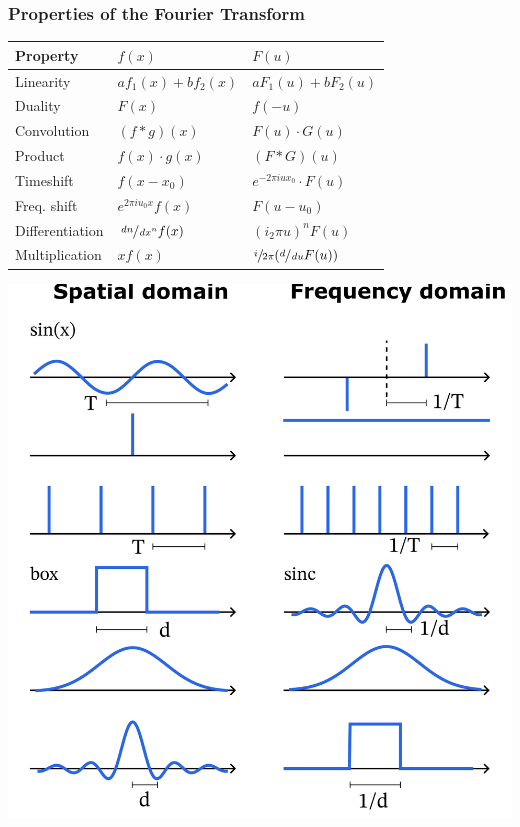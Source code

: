 \documentclass[a4paper,10pt]{article}
\renewcommand*{\arraystretch}{2}
\begin{document}
\subsubsection{Properties of the Fourier Transform}
\begin{center}
    {\renewcommand{\arraystretch}{1.2}
    \begin{tabularx}{\linewidth}{Xll}
	\toprule
	Property & \( f(x) \) & \( F(u) \) \\
	\midrule
	Linearity & \( af_{1}(x) + bf_{2}(x) \) & \( aF_{1}(u) + bF_{2}(u) \) \\
	Duality & \( F(x) \) & \( f(-u) \) \\
	Convolution & \( (f*g)(x) \) & \( F(u) \cdot G(u) \) \\
	Product & \( f(x) \cdot g(x) \) & \( (F*G)(u) \) \\
	Timeshift & \( f(x -x_{0}) \) & \( e^{-2\pi i ux_{0}} \cdot F(u) \) \\
	Freq. shift & \( e^{2\pi i u_{0}x} f(x) \) & \( F(u - u_{0}) \) \\
	Differentiation & \( \sfrac{\mathop{dn}}{\mathop{dx^n}} f(x) \) & \( (i_{2}\pi u)^n F(u) \) \\
	Multiplication & \( xf(x) \) & \( \sfrac{i}{2\pi } (\sfrac{d}{\mathop{du}} F(u)) \) \\
	\bottomrule
    \end{tabularx}
    }
\end{center}
\begin{center}
    \includegraphics[width=\linewidth]{fourier-transforms.png}
\end{center}
\end{document}
